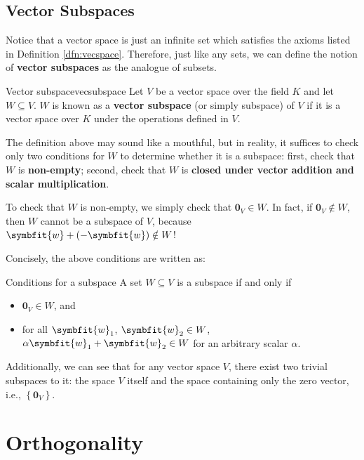 \documentclass[math]{amznotes}
\theoremstyle{remark}
\begin{document}
\section{Vector Subspaces}
Notice that a vector space is just an infinite set which satisfies the axioms listed in Definition \ref{dfn:vecspace}. Therefore, just like any sets, we can define the notion of {\color{red} \textbf{vector subspaces}} as the analogue of subsets.
\begin{dfnbox}{Vector subspace}{vecsubspace}
    Let $V$ be a vector space over the field $K$ and let $W \subseteq V$. $W$ is known as a {\color{red} \textbf{vector subspace}} (or simply subspace) of $V$ if it is a vector space over $K$ under the operations defined in $V$.
\end{dfnbox}
The definition above may sound like a mouthful, but in reality, it suffices to check only two conditions for $W$ to determine whether it is a subspace: first, check that $W$ is {\color{red} \textbf{non-empty}}; second, check that $W$ is {\color{red} \textbf{closed under vector addition and scalar multiplication}}.

To check that $W$ is non-empty, we simply check that $\symbf{0}_V \in W$. In fact, if $\symbf{0}_V \notin W$, then $W$ cannot be a subspace of $V$, because $\symbfit{w} + (-\symbfit{w}) \notin W$!

Concisely, the above conditions are written as:
\begin{thmbox}{Conditions for a subspace}
    A set $W \subseteq V$ is a subspace if and only if 
    \begin{itemize}
        \item $\symbf{0}_V \in W$, and
        \item for all $\symbfit{w}_1$, $\symbfit{w}_2 \in W$, $\alpha \symbfit{w}_1 + \symbfit{w}_2 \in W$ for an arbitrary scalar $\alpha$.
    \end{itemize}
\end{thmbox}
Additionally, we can see that for any vector space $V$, there exist two trivial subspaces to it: the space $V$ itself and the space containing only the zero vector, i.e., $\left\{ \symbf{0}_V \right\}$.
\chapter{Orthogonality}
\end{document}
